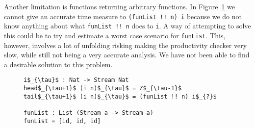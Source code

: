 Another limitation is functions returning arbitrary functions. In Figure~\ref{fig:funList} we cannot give an accurate time measure to \texttt{(funList !! n) i} because we do not know anything about what \texttt{funList !! n} does to \texttt{i}. A way of attempting to solve this could be to try and estimate a worst case scenario for \texttt{funList}. This, however, involves a lot of unfolding risking making the productivity checker very slow, while still not being a very accurate analysis. We have not been able to find a desirable solution to this problem.

\begin{figure}
\begin{Verbatim}[commandchars=\\\{\},codes={\catcode`$=3\catcode`_=8}]
i$_{\tau}$ : Nat -> Stream Nat
head$_{\tau+1}$ (i n)$_{\tau}$ = Z$_{\tau-1}$
tail$_{\tau+1}$ (i n)$_{\tau}$ = (funList !! n) i$_{?}$

funList : List (Stream a -> Stream a)
funList = [id, id, id]
\end{Verbatim}
\caption{}
\label{fig:funList}
\end{figure}